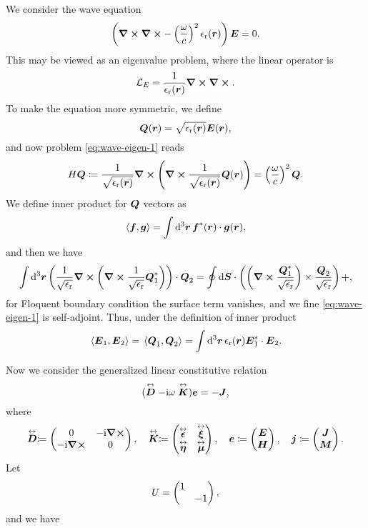 \documentclass[hyperref, a4paper]{article}
\newcommand*{\ii}{\mathrm{i}}
\renewcommand{\tensor}[1]{ \stackrel{\leftrightarrow}{\vb*{#1}}}
\begin{document}
We consider the wave equation 
\begin{equation}
    \left( \curl \curl - \left(\frac{\omega}{c}\right)^2 \epsilon_\text{r}(\vb*{r})\right) \vb*{E} = 0.
\end{equation}
This may be viewed as an eigenvalue problem, where the linear operator is 
\begin{equation}
    \mathcal{L}_E = \frac{1}{\epsilon_\text{r}(\vb*{r})} \curl \curl.
    \label{eq:wave-eigen-1}
\end{equation}
To make the equation more symmetric, we define 
\begin{equation}
    \vb*{Q}(\vb*{r}) = \sqrt{\epsilon_\text{r}(\vb*{r})} \vb*{E}(\vb*{r}),
\end{equation}
and now problem \eqref{eq:wave-eigen-1} reads 
\begin{equation}
    H \vb*{Q} \coloneqq \frac{1}{\sqrt{\epsilon_\text{r}(\vb*{r})}} 
    \curl \left( \curl \frac{1}{\sqrt{\epsilon_\text{r}(\vb*{r})}} \vb*{Q}(\vb*{r}) \right)
    = \left(\frac{\omega}{c}\right)^2 \vb*{Q}.
\end{equation}
We define inner product for $\vb*{Q}$ vectors as 
\[
    \expval{\vb*{f}, \vb*{g}} = \int \dd[3]{\vb*{r}} \vb*{f}^*(\vb*{r}) \cdot \vb*{g}(\vb*{r}),
\]
and then we have 
\[
    \int \dd[3]{\vb*{r}} \left( \frac{1}{\sqrt{\epsilon_\text{r}}} \curl \left( \curl \frac{1}{\sqrt{\epsilon_\text{r}}} \vb*{Q}_1^* \right) \right) \cdot \vb*{Q}_2
    = \oint \dd{\vb*{S}} \cdot \left( \left( \curl \frac{\vb*{Q}^*_1}{\sqrt{\epsilon_\text{r}}} \right) \times \frac{\vb*{Q}_2}{\sqrt{\epsilon_\text{r}}} \right)
    + , %
\]
for Floquent boundary condition the surface term vanishes, and we fine \eqref{eq:wave-eigen-1} is self-adjoint.
Thus, under the definition of inner product 
\begin{equation}
    \expval*{\vb*{E}_1, \vb*{E}_2} = \expval*{\vb*{Q}_1, \vb*{Q}_2} = \int \dd[3]{\vb*{r}} \epsilon_\text{r}(\vb*{r}) \vb*{E}_1^* \cdot \vb*{E}_2.
\end{equation}

Now we consider the generalized linear constitutive relation 
\begin{equation}
    (\tensor{\vb*{D}} - \ii \omega \tensor{\vb*{K}}) \vb*{e} = - \vb*{J},
\end{equation}
where 
\begin{equation}
    \tensor{\vb*{D}} \coloneqq \pmqty{0 & - \ii \curl \\ - \ii \curl & 0}, 
    \quad \tensor{\vb*{K}} \coloneqq \pmqty{ \tensor{\vb*{\epsilon}} & \tensor{\vb*{\xi}} \\ \tensor{\vb*{\eta}} & \tensor{\vb*{\mu}} },
    \quad \vb*{e} \coloneqq \pmqty{\vb*{E} \\ \vb*{H}} , \quad \vb*{j} \coloneqq \pmqty{\vb*{J} \\ \vb*{M}}.
\end{equation}
Let 
\begin{equation}
    U = \pmqty{\dmat{1, -1}},
\end{equation}
and we have 
\end{document}
